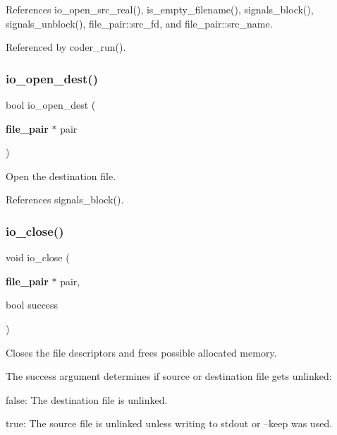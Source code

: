 References io\+\_\+open\+\_\+src\+\_\+real(), is\+\_\+empty\+\_\+filename(), signals\+\_\+block(), signals\+\_\+unblock(), file\+\_\+pair\+::src\+\_\+fd, and file\+\_\+pair\+::src\+\_\+name.



Referenced by coder\+\_\+run().

\mbox{\label{file__io_8h_a51c7b0ad8b7829773a69972565b7d08d}} 
\subsubsection{io\+\_\+open\+\_\+dest()}
{\footnotesize\ttfamily bool io\+\_\+open\+\_\+dest (\begin{DoxyParamCaption}\item[{\textbf{ file\+\_\+pair} $\ast$}]{pair }\end{DoxyParamCaption})}



Open the destination file. 



References signals\+\_\+block().

\mbox{\label{file__io_8h_a8dcc56461111f392398385820ad9c1d9}} 
\subsubsection{io\+\_\+close()}
{\footnotesize\ttfamily void io\+\_\+close (\begin{DoxyParamCaption}\item[{\textbf{ file\+\_\+pair} $\ast$}]{pair,  }\item[{bool}]{success }\end{DoxyParamCaption})}



Closes the file descriptors and frees possible allocated memory. 

The success argument determines if source or destination file gets unlinked\+:
\begin{DoxyItemize}
\item false\+: The destination file is unlinked.
\item true\+: The source file is unlinked unless writing to stdout or --keep was used. 
\end{DoxyItemize}

